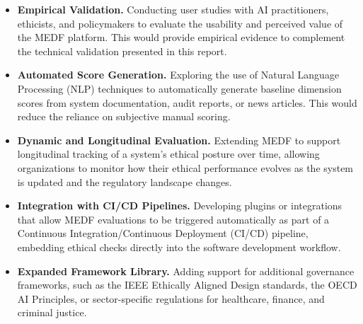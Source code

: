 \begin{itemize}[leftmargin=2em]
  \item \textbf{Empirical Validation.} Conducting user studies with AI practitioners, ethicists, and policymakers to evaluate the usability and perceived value of the MEDF platform. This would provide empirical evidence to complement the technical validation presented in this report.

  \item \textbf{Automated Score Generation.} Exploring the use of Natural Language Processing (NLP) techniques to automatically generate baseline dimension scores from system documentation, audit reports, or news articles. This would reduce the reliance on subjective manual scoring.

  \item \textbf{Dynamic and Longitudinal Evaluation.} Extending MEDF to support longitudinal tracking of a system's ethical posture over time, allowing organizations to monitor how their ethical performance evolves as the system is updated and the regulatory landscape changes.

  \item \textbf{Integration with CI/CD Pipelines.} Developing plugins or integrations that allow MEDF evaluations to be triggered automatically as part of a Continuous Integration/Continuous Deployment (CI/CD) pipeline, embedding ethical checks directly into the software development workflow.

  \item \textbf{Expanded Framework Library.} Adding support for additional governance frameworks, such as the IEEE Ethically Aligned Design standards, the OECD AI Principles, or sector-specific regulations for healthcare, finance, and criminal justice.
\end{itemize}
